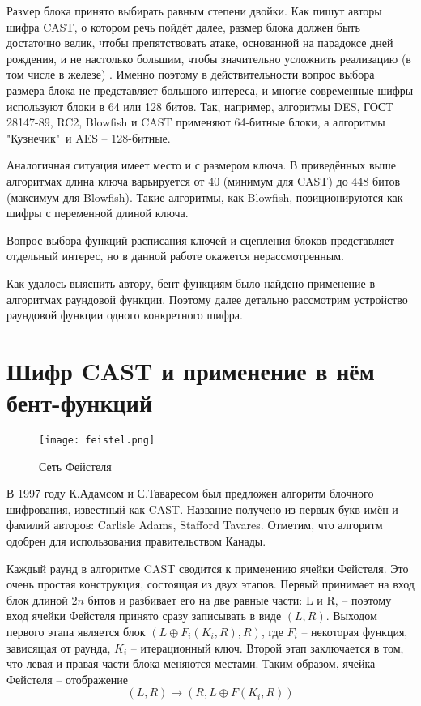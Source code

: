 \documentclass[12pt, a4paper, reqno]{article}
\begin{document}
    Размер блока принято выбирать равным степени двойки. Как пишут авторы шифра CAST, о котором речь
    пойдёт далее, размер блока должен быть достаточно велик, чтобы препятствовать атаке, основанной
    на парадоксе дней рождения, и не настолько большим, чтобы значительно усложнить реализацию (в
    том числе в железе) \cite{cast}. Именно поэтому в действительности вопрос выбора размера блока
    не представляет большого интереса, и многие современные шифры используют блоки в 64 или 128
    битов. Так, например, алгоритмы DES, ГОСТ 28147-89, RC2, Blowfish и CAST применяют 64-битные
    блоки, а алгоритмы "Кузнечик"\ и AES -- 128-битные.

    Аналогичная ситуация имеет место и с размером ключа. В приведённых выше алгоритмах длина ключа
    варьируется от 40 (минимум для CAST) до 448 битов (максимум для Blowfish). Такие алгоритмы, как
    Blowfish, позиционируются как шифры с переменной длиной ключа.

    Вопрос выбора функций расписания ключей и сцепления блоков представляет отдельный интерес, но
    в данной работе окажется нерассмотренным.

    Как удалось выяснить автору, бент-функциям было найдено применение в алгоритмах раундовой
    функции. Поэтому далее детально рассмотрим устройство раундовой функции одного конкретного
    шифра.

\section{Шифр CAST и применение в нём бент-функций}

    \begin{wrapfigure}{r}{0.25\textwidth}
        \centering
        \texttt{[image: feistel.png]}
        \caption{Сеть Фейстеля}
    \end{wrapfigure}

    В 1997 году К.Адамсом и С.Таваресом был предложен алгоритм блочного шифрования, известный как
    CAST. Название получено из первых букв имён и фамилий авторов: Carlisle Adams, Stafford Tavares.
    Отметим, что алгоритм одобрен для использования правительством Канады.

    Каждый раунд в алгоритме CAST сводится к применению ячейки Фейстеля. Это очень простая
    конструкция, состоящая из двух этапов. Первый принимает на вход блок длиной $2n$ битов и
    разбивает его на две равные части: L и R, -- поэтому вход ячейки Фейстеля принято сразу
    записывать в виде $(L, R)$. Выходом первого этапа является блок $(L \oplus F_i(K_i, R), R)$, где
    $F_i$ -- некоторая функция, зависящая от раунда, $K_i$ -- итерационный ключ. Второй этап
    заключается в том, что левая и правая части блока меняются местами. Таким образом, ячейка
    Фейстеля -- отображение
    \begin{equation*}
        (L, R) \to (R, L \oplus F(K_i, R))
    \end{equation*}
\end{document}

